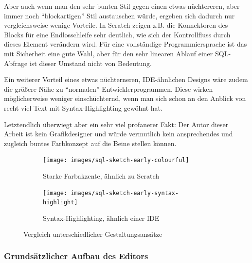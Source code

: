 \documentclass[paper=a4,fontsize=11pt,parskip=half]{scrartcl}
\begin{document}

Aber auch wenn man den sehr bunten Stil gegen einen etwas nüchtereren, aber immer noch ``blockartigen'' Stil austauschen würde, ergeben sich dadurch nur vergleichsweise wenige Vorteile. In Scratch zeigen z.B. die Konnektoren des Blocks für eine Endlosschleife sehr deutlich, wie sich der Kontrollfluss durch dieses Element verändern wird. Für eine vollständige Programmiersprache ist das mit Sicherheit eine gute Wahl, aber für den sehr linearen Ablauf einer SQL-Abfrage ist dieser Umstand nicht von Bedeutung.

Ein weiterer Vorteil eines etwas nüchterneren, IDE-ähnlichen Designs wäre zudem die größere Nähe zu ``normalen'' Entwicklerprogrammen. Diese wirken möglicherweise weniger einschüchternd, wenn man sich schon an den Anblick von recht viel Text mit Syntax-Highlighting gewöhnt hat.

Letztendlich überwiegt aber ein sehr viel profanerer Fakt: Der Autor dieser Arbeit ist kein Grafikdesigner und würde vermutlich kein ansprechendes und zugleich buntes Farbkonzept auf die Beine stellen können.

\begin{figure}
  \begin{subfigure}[b]{0.45\textwidth}
    \texttt{[image: images/sql-sketch-early-colourful]}
    \caption{Starke Farbakzente, ähnlich zu Scratch}
    \label{fig:screen-sql-editor-early-colourful}
  \end{subfigure}\hfill
  \begin{subfigure}[b]{0.45\textwidth}
    \texttt{[image: images/sql-sketch-early-syntax-highlight]}
    \caption{Syntax-Highlighting, ähnlich einer IDE}
    \label{fig:screen-sql-editor-early-syntax-highlighting}
  \end{subfigure}
  \caption{Vergleich unterschiedlicher Gestaltungsansätze}
  \label{fig:compare-colourful}
\end{figure}

\subsubsection{Grundsätzlicher Aufbau des Editors}
\end{document}
